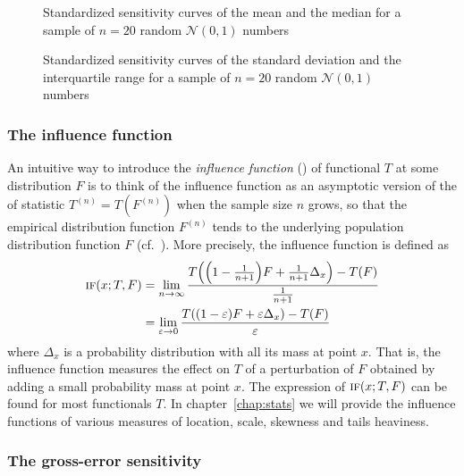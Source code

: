 \begin{figure}[h!]
    \centering
    \caption{Standardized sensitivity curves of the mean and the median for a sample of $n=20$ random $\mathcal{N}(0,1)$ numbers}
    \label{fig:theory:SClocation}
\end{figure}

\begin{figure}[h!]
    \centering
    \caption{Standardized sensitivity curves of the standard deviation and the interquartile range for a sample of $n=20$ random $\mathcal{N}(0,1)$ numbers}
    \label{fig:theory:SCscale}
\end{figure}


\subsubsection{The influence function}

An intuitive way to introduce the \emph{influence function} () of
functional $T$ at some distribution $F$ is to think of the influence function
as an asymptotic version of the  of statistic $T^{(n)}=T(F^{(n)})$
when the sample size $n$ grows, so that the empirical distribution function
$F^{(n)}$ tends to the underlying population distribution function $F$ (cf.\
\citealp{hampel:1974}). More precisely, the influence function is defined as
%
\begin{align*}
    \stsc{IF}(x; T, F) 
        &= \lim_{n\rightarrow\infty} \frac{T\left(\left(1-\frac{1}{n+1}\right) F + 
            \frac{1}{n+1} \Delta_x\right) - T(F)}{\frac{1}{n+1}} \\
        &= \lim_{\varepsilon\rightarrow 0} \frac{T\left((1-\varepsilon) F + 
            \varepsilon\Delta_x\right) - T(F)}{\varepsilon}
\end{align*}
%
where $\Delta_x$ is a probability distribution with all its mass at point
$x$. That is, the influence function measures the effect on $T$ of a
perturbation of $F$ obtained by adding a small probability mass at point $x$. The expression of
$\stsc{IF}(x;T,F)$ can be found for most functionals $T$. In
chapter~\ref{chap:stats} we will provide the influence functions
of various measures of location, scale, skewness and tails heaviness.


\subsubsection{The gross-error sensitivity}

